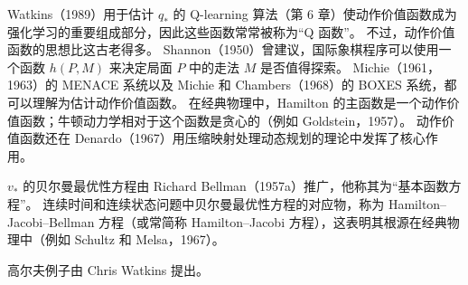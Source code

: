 \documentclass[UTF8, 12pt, fontset=fandol, oneside]{ctexart}
\begin{document}
Watkins（1989）用于估计 $q_*$ 的 Q-learning 算法（第 6 章）使动作价值函数成为强化学习的重要组成部分，因此这些函数常常被称为“Q 函数”。
不过，动作价值函数的思想比这古老得多。
Shannon（1950）曾建议，国际象棋程序可以使用一个函数 $h(P,M)$ 来决定局面 $P$ 中的走法 $M$ 是否值得探索。
Michie（1961，1963）的 MENACE 系统以及 Michie 和 Chambers（1968）的 BOXES 系统，都可以理解为估计动作价值函数。
在经典物理中，Hamilton 的主函数是一个动作价值函数；牛顿动力学相对于这个函数是贪心的（例如 Goldstein，1957）。
动作价值函数还在 Denardo（1967）用压缩映射处理动态规划的理论中发挥了核心作用。

$v_*$ 的贝尔曼最优性方程由 Richard Bellman（1957a）推广，他称其为“基本函数方程”。
连续时间和连续状态问题中贝尔曼最优性方程的对应物，称为 Hamilton--Jacobi--Bellman 方程（或常简称 Hamilton--Jacobi 方程），这表明其根源在经典物理中（例如 Schultz 和 Melsa，1967）。

高尔夫例子由 Chris Watkins 提出。
\end{document}
